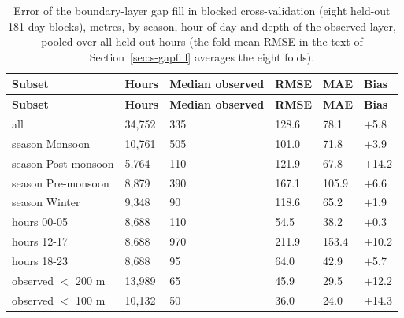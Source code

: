 \begingroup\footnotesize
\begin{longtable}{L{4.4cm} C{1.4cm} C{2.0cm} C{1.4cm} C{1.4cm} C{1.4cm}}
\caption{Error of the boundary-layer gap fill in blocked cross-validation (eight held-out 181-day blocks), metres, by season, hour of day and depth of the observed layer, pooled over all held-out hours (the fold-mean RMSE in the text of Section~\ref{sec:s-gapfill} averages the eight folds).}\label{tab:s-gapfill}\\
\toprule
\textbf{Subset} & \textbf{Hours} & \textbf{Median observed} & \textbf{RMSE} & \textbf{MAE} & \textbf{Bias} \\
\midrule\endfirsthead
\toprule
\textbf{Subset} & \textbf{Hours} & \textbf{Median observed} & \textbf{RMSE} & \textbf{MAE} & \textbf{Bias} \\
\midrule\endhead
\bottomrule\endfoot
all & 34,752 & 335 & 128.6 & 78.1 & $+$5.8 \\
season Monsoon & 10,761 & 505 & 101.0 & 71.8 & $+$3.9 \\
season Post-monsoon & 5,764 & 110 & 121.9 & 67.8 & $+$14.2 \\
season Pre-monsoon & 8,879 & 390 & 167.1 & 105.9 & $+$6.6 \\
season Winter & 9,348 & 90 & 118.6 & 65.2 & $+$1.9 \\
hours 00-05 & 8,688 & 110 & 54.5 & 38.2 & $+$0.3 \\
hours 12-17 & 8,688 & 970 & 211.9 & 153.4 & $+$10.2 \\
hours 18-23 & 8,688 & 95 & 64.0 & 42.9 & $+$5.7 \\
observed $<$ 200 m & 13,989 & 65 & 45.9 & 29.5 & $+$12.2 \\
observed $<$ 100 m & 10,132 & 50 & 36.0 & 24.0 & $+$14.3 \\
\end{longtable}
\endgroup
